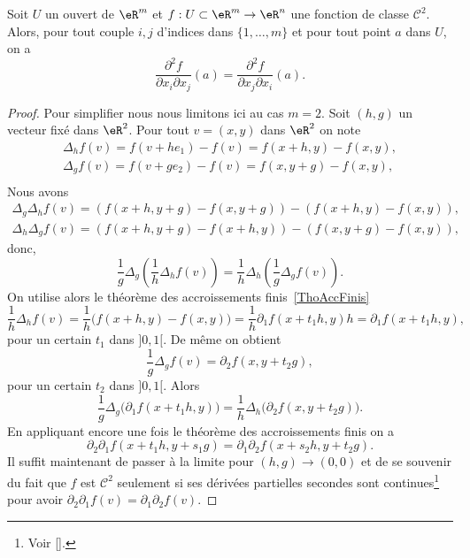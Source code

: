 \begin{theorem}[Schwarz]\label{Schwarz}
 Soit $U$ un ouvert de $\eR^m$ et  $f:U\subset\eR^m\to \eR^n$ une fonction de classe $\mathcal{C}^2$. Alors, pour tout couple $i,j$ d'indices dans $\{1,\ldots, m\}$ et pour tout point $a$ dans $U$, on a
\[
\frac{\partial^2 f}{\partial  x_i\partial x_j}(a)=\frac{\partial^2 f}{\partial  x_j\partial x_i}(a).
\]
\end{theorem}
\begin{proof}
  Pour simplifier nous nous limitons ici au cas $m=2$. Soit $(h,g)$ un vecteur fixé dans $\eR^2$. Pour tout  $v=(x,y)$ dans $\eR^2$ on note
  \begin{equation}
    \begin{array}{c}
      \Delta_h f(v)=f(v+he_1) -f(v) = f(x+h,y)-f(x,y),\\
      \Delta_g f(v)=f(v+ge_2) -f(v) = f(x,y+g)-f(x,y),\\
    \end{array}
  \end{equation}
Nous avons
\begin{equation}
  \begin{array}{c}
   \Delta_g   \Delta_h f(v)=\left(f(x+h,y+g)-f(x,y+g)\right)-\left(f(x+h,y)-f(x,y)\right),\\
   \Delta_h   \Delta_g f(v)=\left(f(x+h,y+g)-f(x+h,y)\right)-\left(f(x,y+g)-f(x,y)\right),
  \end{array}
\end{equation}
donc,
\begin{equation}
  \frac{1}{g} \Delta_g  \left(\frac{1}{h} \Delta_h f(v)\right) = \frac{1}{h} \Delta_h \left(\frac{1}{g} \Delta_g f(v)\right).
\end{equation}
On utilise alors le théorème des accroissements finis~\ref{ThoAccFinis}
\begin{equation}
\frac{1}{h} \Delta_h f(v)=\frac{1}{h}\big(f(x+h,y)-f(x,y)\big)=\frac{1}{h}\partial_1f(x+t_1h,y )h=\partial_1f(x+t_1h, y),
\end{equation}
pour un certain $t_1$ dans $]0,1[$. De même on obtient
\[
\frac{1}{g} \Delta_g f(v)= \partial_2 f(x, y+t_2g),
\]
pour un certain $t_2$ dans $]0,1[$. Alors
 \begin{equation}
  \frac{1}{g} \Delta_g  \big(\partial_1f(x+t_1h, y)\big) = \frac{1}{h} \Delta_h \big(\partial_2 f(x, y+t_2g)\big).
\end{equation}
En appliquant encore une fois le théorème des accroissements finis on a
 \begin{equation}
  \partial_2\partial_1f(x+t_1h, y+s_1g) = \partial_1\partial_2 f(x+s_2h, y+t_2g).
\end{equation}
Il suffit maintenant de passer à la limite pour $(h,g) \to (0,0)$ et de se souvenir du fait que $f$ est $\mathcal{C}^2$ seulement si ses dérivées partielles secondes sont continues\footnote{Voir \ref{}.} pour avoir $\partial_2\partial_1f(v)=\partial_1\partial_2 f(v)$.
\end{proof}
